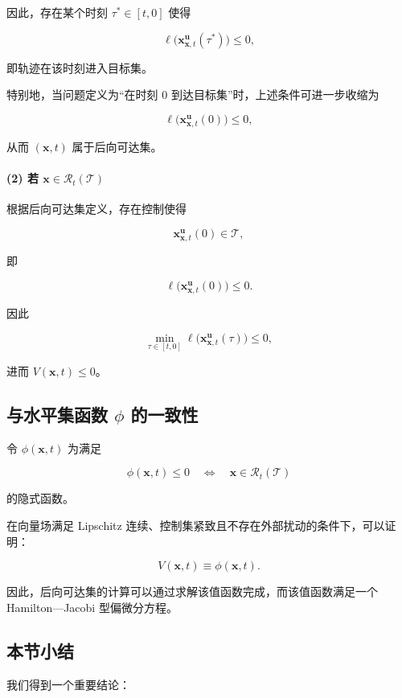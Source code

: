 \documentclass[11pt]{ctexrep}
\begin{document}
因此，存在某个时刻 $\tau^\ast \in [t,0]$ 使得

\[
\ell\big(
\mathbf{x}^{\mathbf{u}}_{\mathbf{x},t}(\tau^\ast)
\big)
\le 0,
\]

即轨迹在该时刻进入目标集。

特别地，当问题定义为“在时刻 $0$ 到达目标集”时，上述条件可进一步收缩为

\[
\ell\big(
\mathbf{x}^{\mathbf{u}}_{\mathbf{x},t}(0)
\big)
\le 0,
\]

从而 $(\mathbf{x},t)$ 属于后向可达集。

\paragraph{(2) 若 $\mathbf{x} \in \mathcal{R}_t(\mathcal{T})$}

根据后向可达集定义，存在控制使得

\[
\mathbf{x}^{\mathbf{u}}_{\mathbf{x},t}(0) \in \mathcal{T},
\]

即

\[
\ell\big(
\mathbf{x}^{\mathbf{u}}_{\mathbf{x},t}(0)
\big)
\le 0.
\]

因此

\[
\min_{\tau \in [t,0]}
\ell\big(
\mathbf{x}^{\mathbf{u}}_{\mathbf{x},t}(\tau)
\big)
\le 0,
\]

进而 $V(\mathbf{x},t) \le 0$。

\subsection{与水平集函数 $\phi$ 的一致性}

令 $\phi(\mathbf{x},t)$ 为满足

\[
\phi(\mathbf{x},t) \le 0
\quad \Longleftrightarrow \quad
\mathbf{x} \in \mathcal{R}_t(\mathcal{T})
\]

的隐式函数。

在向量场满足 Lipschitz 连续、控制集紧致且不存在外部扰动的条件下，可以证明：

\[
V(\mathbf{x},t) \equiv \phi(\mathbf{x},t).
\]

因此，后向可达集的计算可以通过求解该值函数完成，而该值函数满足一个 Hamilton---Jacobi 型偏微分方程。

\subsection{本节小结}

我们得到一个重要结论：

\begin{center}
\end{center}
\end{document}
